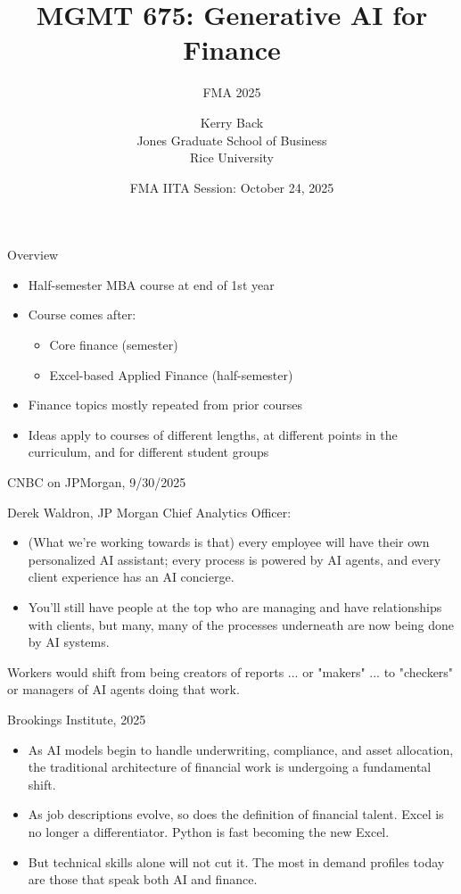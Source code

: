 \documentclass{beamer}
\title{MGMT 675: Generative AI for Finance}
\subtitle{FMA 2025}
\date{FMA IITA Session: October 24, 2025}
\author{Kerry Back\\ 
Jones Graduate School of Business\\
Rice University}
\begin{document}
\initclock

\maketitle


\begin{frame}{Overview}
    \begin{itemize}
    \item Half-semester MBA course at end of 1st year
    \item Course comes after: 
    \begin{itemize}
    \item Core finance (semester) 
    \item Excel-based Applied Finance (half-semester)
    \end{itemize}
    \item Finance topics mostly repeated from prior courses
    \item Ideas apply to courses of different lengths, at different points in the curriculum, and for different student groups
    \end{itemize}

\end{frame}


\begin{frame}{CNBC on JPMorgan, 9/30/2025}

Derek Waldron, JP Morgan Chief Analytics Officer:
\begin{itemize}
\item (What we're working towards is that) every employee will have their own personalized AI assistant; every process is powered by AI agents, and every client experience has an AI concierge.
\item You'll still have people at the top who are managing and have relationships with clients, but many, many of the processes underneath are now being done by AI systems.
\end{itemize}


Workers would shift from being creators of reports ... or "makers" ... to "checkers" or managers of AI agents doing that work.

\end{frame}

\begin{frame}{Brookings Institute, 2025}

\begin{itemize}
\item As AI models begin to handle underwriting, compliance, and asset allocation, the traditional architecture of financial work is undergoing a fundamental shift.
\item As job descriptions evolve, so does the definition of financial talent. Excel is no longer a differentiator. Python is fast becoming the new Excel. 
\item But technical skills alone will not cut it. The \alert{most in demand profiles today are those that speak both AI and finance}.
\end{itemize}
\end{frame}
\end{document}
